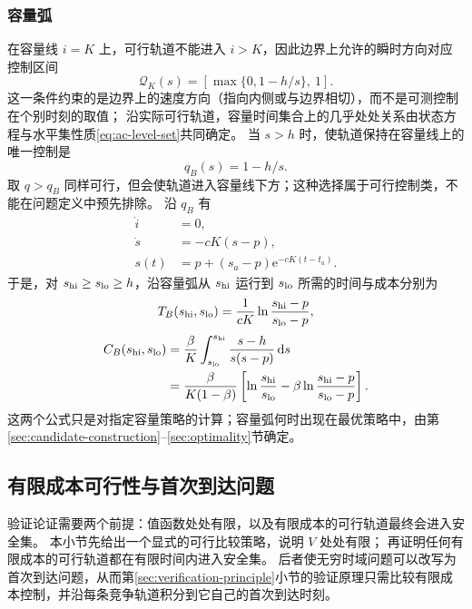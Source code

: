 \documentclass[11pt,a4paper,UTF8]{ctexart}
\theoremstyle{definition}
\newcommand{\dd}{\,\mathrm d}
\newcommand{\e}{\mathrm e}
\begin{document}
\subsubsection{容量弧}
\label{sec:boundary-arc}
在容量线 $i=K$ 上，可行轨道不能进入 $i>K$，因此边界上允许的瞬时方向对应控制区间
\begin{equation}
\mathcal Q_K(s)=\left[\max\{0,1-h/s\},\ 1\right].
\label{eq:boundary-feasible}
\end{equation}
这一条件约束的是边界上的速度方向（指向内侧或与边界相切），而不是可测控制在个别时刻的取值；
沿实际可行轨道，容量时间集合上的几乎处处关系由状态方程与水平集性质\eqref{eq:ac-level-set}共同确定。
当 $s>h$ 时，使轨道保持在容量线上的唯一控制是
\begin{equation}
\boxed{q_B(s)=1-h/s.}
\label{eq:qB}
\end{equation}
取 $q>q_B$ 同样可行，但会使轨道进入容量线下方；这种选择属于可行控制类，不能在问题定义中预先排除。
沿 $q_B$ 有
\begin{align}
\dot i&=0,\label{eq:boundary-i}\\
\dot s&=-cK(s-p),\label{eq:boundary-s}\\
s(t)&=p+(s_a-p)\e^{-cK(t-t_a)}.\label{eq:boundary-s-explicit}
\end{align}
于是，对 $s_{\rm hi}\ge s_{\rm lo}\ge h$，沿容量弧从 $s_{\rm hi}$ 运行到 $s_{\rm lo}$ 所需的时间与成本分别为
\begin{equation}
T_B(s_{\rm hi},s_{\rm lo})=\frac1{cK}\ln\frac{s_{\rm hi}-p}{s_{\rm lo}-p},
\label{eq:boundary-duration}
\end{equation}
\begin{align}
C_B(s_{\rm hi},s_{\rm lo})
&=\frac \beta K\int_{s_{\rm lo}}^{s_{\rm hi}}\frac{s-h}{s(s-p)}\dd s\notag\\
&=\frac{\beta}{K(1-\beta)}\left[\ln\frac{s_{\rm hi}}{s_{\rm lo}}
-\beta\ln\frac{s_{\rm hi}-p}{s_{\rm lo}-p}\right].
\label{eq:boundary-cost}
\end{align}
这两个公式只是对指定容量策略的计算；容量弧何时出现在最优策略中，由第\ref{sec:candidate-construction}--\ref{sec:optimality}节确定。

\subsection{有限成本可行性与首次到达问题}
\label{sec:exit-time}
验证论证需要两个前提：值函数处处有限，以及有限成本的可行轨道最终会进入安全集。
本小节先给出一个显式的可行比较策略，说明 $V$ 处处有限；
再证明任何有限成本的可行轨道都在有限时间内进入安全集。
后者使无穷时域问题可以改写为首次到达问题，从而第\ref{sec:verification-principle}小节的验证原理只需比较有限成本控制，并沿每条竞争轨道积分到它自己的首次到达时刻。
\end{document}
